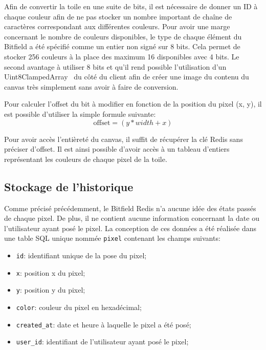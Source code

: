 Afin de convertir la toile en une suite de bits, il est nécessaire de donner un ID à chaque couleur afin de ne pas stocker un nombre important de chaîne de caractères correspondant aux différentes couleurs. Pour avoir une marge concernant le nombre de couleurs disponibles, le type de chaque élément du Bitfield a été spécifié comme un entier non signé sur 8 bits. Cela permet de stocker 256 couleurs à la place des maximum 16 disponibles avec 4 bits. Le second avantage à utiliser 8 bits et qu'il rend possible l'utilisation d'un Uint8ClampedArray~\cite{uint8clampedarray} du côté du client afin de créer une image du contenu du canvas très simplement sans avoir à faire de conversion.

Pour calculer l'offset du bit à modifier en fonction de la position du pixel (x, y), il est possible d'utiliser la simple formule suivante:
\begin{equation}
  \mathrm{offset} = (y * width + x)
\end{equation}

Pour avoir accès l'entièreté du canvas, il suffit de récupérer la clé Redis sans préciser d'offset. Il est ainsi possible d'avoir accès à un tableau d'entiers représentant les couleurs de chaque pixel de la toile.

\subsection{Stockage de l'historique}

Comme précisé précédemment, le Bitfield Redis n'a aucune idée des états passés de chaque pixel. De plus, il ne contient aucune information concernant la date ou l'utilisateur ayant posé le pixel. La conception de ces données a été réalisée dans une table SQL unique nommée \texttt{pixel} contenant les champs suivants:

\begin{itemize}
  \item \texttt{id}: identifiant unique de la pose du pixel;
  \item \texttt{x}: position x du pixel;
  \item \texttt{y}: position y du pixel;
  \item \texttt{color}: couleur du pixel en hexadécimal;
  \item \texttt{created\_at}: date et heure à laquelle le pixel a été posé;
  \item \texttt{user\_id}: identifiant de l'utilisateur ayant posé le pixel;
\end{itemize}

